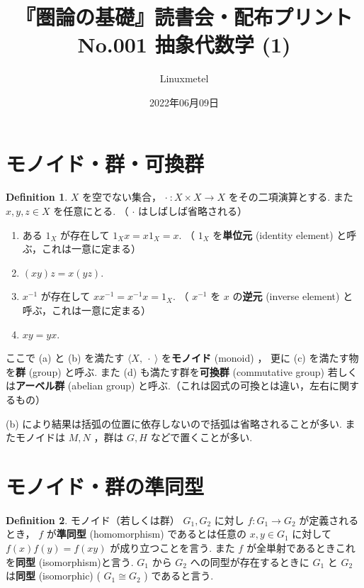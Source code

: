 \documentclass[landscape, twocolumn, column_gap=2zw, head_space=15mm, foot_space=15mm, font_size=5pt, jafontscale=0.9, line_length=40zw]{jlreq}
\title{『圏論の基礎』読書会・配布プリント No.001 抽象代数学 (1)}
\author{Linuxmetel}
\date{2022年06月09日}
\theoremstyle{definition}
\newtheorem{definition}{Definition}[section]
\begin{document}


 \section{モノイド・群・可換群}
 \begin{definition}
 $X$ を空でない集合， $\cdot\ : X \times X \rightarrow X$ をその二項演算とする. また $x, y, z \in X$ を任意にとる. （ $\cdot$ はしばしば省略される）
  \begin{enumerate}
   \item ある $1_X$ が存在して $1_Xx = x1_X=x$. （ $1_X$ を\textbf{単位元} (identity element) と呼ぶ，これは一意に定まる）
   \item $(xy)z = x(yz)$.
   \item $x^{-1}$ が存在して $xx^{-1} = x^{-1}x=1_X$. （ $x^{-1}$ を $x$ の\textbf{逆元} (inverse element) と呼ぶ，これは一意に定まる）
   \item $xy = yx$.
  \end{enumerate}

  ここで (a) と (b) を満たす $\langle X, \ \cdot\ \rangle$ を\textbf{モノイド} (monoid) ， 更に (c) を満たす物を\textbf{群} (group) と呼ぶ. また (d) も満たす群を\textbf{可換群} (commutative group) 若しくは\textbf{アーベル群} (abelian group) と呼ぶ.（これは図式の可換とは違い，左右に関するもの）

  (b) により結果は括弧の位置に依存しないので括弧は省略されることが多い. またモノイドは $M, N$ ，群は $G, H$ などで置くことが多い.
 \end{definition}
 

 \section{モノイド・群の準同型}
 \begin{definition}
  モノイド（若しくは群） $G_1, G_2$ に対し $ f : G_1 \rightarrow G_2$ が定義されるとき， $f$ が\textbf{準同型} (homomorphism) であるとは任意の $x, y ∈ G_1$ に対して $f(x)f(y)=f(xy)$ が成り立つことを言う. また $f$ が全単射であるときこれを\textbf{同型} (isomorphism)と言う. $G_1$ から $G_2$ への同型が存在するときに $G_1$ と $G_2$ は\textbf{同型} (isomorphic) ( $G_1 \cong G_2$ ) であると言う.
 \end{definition}
\end{document}
